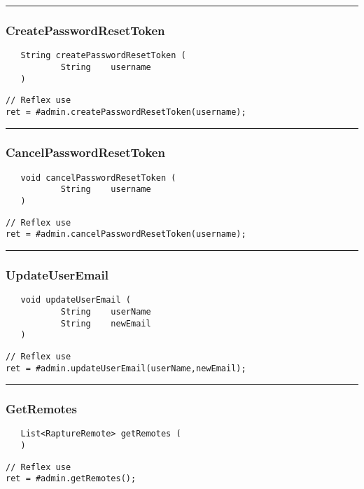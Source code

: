 \rule{15cm}{2pt}
\subsubsection{CreatePasswordResetToken}
\label{Api:CreatePasswordResetToken}
\begin{verbatim}
   String createPasswordResetToken (
           String    username
   )
\end{verbatim}
\begin{lstlisting}[language=reflex]
// Reflex use
ret = #admin.createPasswordResetToken(username);
\end{lstlisting}



\rule{15cm}{2pt}
\subsubsection{CancelPasswordResetToken}
\label{Api:CancelPasswordResetToken}
\begin{verbatim}
   void cancelPasswordResetToken (
           String    username
   )
\end{verbatim}
\begin{lstlisting}[language=reflex]
// Reflex use
ret = #admin.cancelPasswordResetToken(username);
\end{lstlisting}



\rule{15cm}{2pt}
\subsubsection{UpdateUserEmail}
\label{Api:UpdateUserEmail}
\begin{verbatim}
   void updateUserEmail (
           String    userName
           String    newEmail
   )
\end{verbatim}
\begin{lstlisting}[language=reflex]
// Reflex use
ret = #admin.updateUserEmail(userName,newEmail);
\end{lstlisting}



\rule{15cm}{2pt}
\subsubsection{GetRemotes}
\label{Api:GetRemotes}
\begin{verbatim}
   List<RaptureRemote> getRemotes (
   )
\end{verbatim}
\begin{lstlisting}[language=reflex]
// Reflex use
ret = #admin.getRemotes();
\end{lstlisting}




